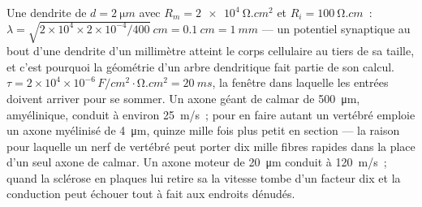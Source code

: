 \begin{example}\label{ex:b3:nervous-systems:numbers}
Une dendrite de $d = \qty{2}{\micro m}$ avec $R_{m} = \qty{2e4}{\ohm.cm^2}$
et $R_{i} = \qty{100}{\ohm.cm}$~: $\lambda = \sqrt{2\times 10^{4}\times
2\times 10^{-4}/400}\ \unit{cm} = \qty{0.1}{cm} = \qty{1}{mm}$ --- un
potentiel synaptique au bout d'une dendrite d'un millimètre atteint le
corps cellulaire au tiers de sa taille, et c'est pourquoi la géométrie
d'un arbre dendritique fait partie de son calcul. $\tau = 2\times 10^{4}\times
10^{-6}\,\unit{F/cm^2}\cdot\unit{\ohm.cm^2} = \qty{20}{ms}$, la fenêtre
dans laquelle les entrées doivent arriver pour se sommer. Un axone géant
de calmar de \qty{500}{\micro m}, amyélinique, conduit à environ
\qty{25}{m/s}~; pour en faire autant un vertébré emploie un axone
myélinisé de \qty{4}{\micro m}, quinze mille fois plus petit en section
--- la raison pour laquelle un nerf de vertébré peut porter dix mille
fibres rapides dans la place d'un seul axone de calmar. Un axone moteur
de \qty{20}{\micro m} conduit à \qty{120}{m/s}~; quand la sclérose en
plaques lui retire sa  la vitesse tombe d'un facteur dix et la
conduction peut échouer tout à fait aux endroits dénudés.
\end{example}

